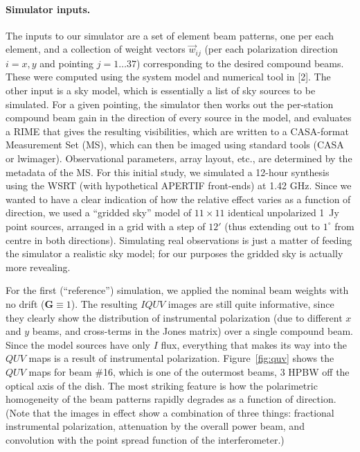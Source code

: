 \documentclass{aps2010} \special{papersize=8.5in,11in}
\begin{document}
\paragraph*{Simulator inputs.} The inputs to our simulator are a set of element beam patterns, one per each element, 
and a collection of weight vectors $\vec w_{ij}$ (per each polarization direction $i=x,y$ and pointing $j=1\ldots37$) corresponding to the desired compound beams. These were computed using the system model and numerical tool in [2]. The other input is a sky model, which is essentially a list of sky sources to be simulated. For a given pointing, the simulator then works out the per-station compound beam gain in the direction of every source in the model, and evaluates a RIME that gives the resulting visibilities, which are written to a CASA-format Measurement Set (MS), which can then be imaged using standard tools (CASA or lwimager). Observational parameters, array layout, etc., are determined by the metadata of the MS. For this initial study, we simulated a 12-hour synthesis using the WSRT (with hypothetical APERTIF front-ends) at 1.42 GHz. Since we wanted to have a clear indication of how the relative effect varies as a function of direction, we used a ``gridded sky'' model of $11\times11$ identical unpolarized 1~Jy point sources, arranged in a grid with a step of $12'$ (thus extending out to $1^\circ$ from centre in both directions). Simulating real observations is just a matter of feeding the simulator a realistic sky model; for our purposes the gridded sky is actually more revealing.

For the first (``reference'') simulation, we applied the nominal beam weights with no drift ($\mathbf{G}\equiv1$). The resulting $IQUV$ images are still quite informative, since they clearly show the distribution of instrumental polarization (due to different $x$ and $y$ beams, and cross-terms in the Jones matrix) over a single compound beam. Since the model sources have only $I$ flux, everything that makes its way into the $QUV$ maps is a result of instrumental polarization. Figure~\ref{fig:quv} shows the $QUV$ maps for beam \#16, which is one of the outermost beams, 3 HPBW off the optical axis of the dish. The most striking feature is how the polarimetric homogeneity of the beam patterns rapidly degrades as a function of direction. (Note that the images in effect show a combination of three things: fractional instrumental polarization, attenuation by the overall power beam, and convolution with the point spread function of the interferometer.) 
\end{document}
